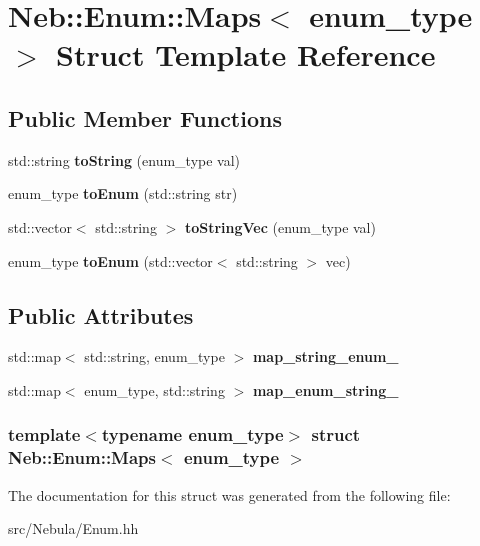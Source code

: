 \hypertarget{structNeb_1_1Enum_1_1Maps}{\section{\-Neb\-:\-:\-Enum\-:\-:\-Maps$<$ enum\-\_\-type $>$ \-Struct \-Template \-Reference}
\label{structNeb_1_1Enum_1_1Maps}
}
\subsection*{\-Public \-Member \-Functions}
\begin{DoxyCompactItemize}
\item 
\hypertarget{structNeb_1_1Enum_1_1Maps_ac9e855809a6118d50ca6d0b9a24f80a9}{std\-::string {\bfseries to\-String} (enum\-\_\-type val)}\label{structNeb_1_1Enum_1_1Maps_ac9e855809a6118d50ca6d0b9a24f80a9}

\item 
\hypertarget{structNeb_1_1Enum_1_1Maps_a716d4db5d843605cdf44a9687aca4779}{enum\-\_\-type {\bfseries to\-Enum} (std\-::string str)}\label{structNeb_1_1Enum_1_1Maps_a716d4db5d843605cdf44a9687aca4779}

\item 
\hypertarget{structNeb_1_1Enum_1_1Maps_af9858502b1b91eb41ff71c4d7e4fbc88}{std\-::vector$<$ std\-::string $>$ {\bfseries to\-String\-Vec} (enum\-\_\-type val)}\label{structNeb_1_1Enum_1_1Maps_af9858502b1b91eb41ff71c4d7e4fbc88}

\item 
\hypertarget{structNeb_1_1Enum_1_1Maps_a21e77595988229f4555999a0c9231432}{enum\-\_\-type {\bfseries to\-Enum} (std\-::vector$<$ std\-::string $>$ vec)}\label{structNeb_1_1Enum_1_1Maps_a21e77595988229f4555999a0c9231432}

\end{DoxyCompactItemize}
\subsection*{\-Public \-Attributes}
\begin{DoxyCompactItemize}
\item 
\hypertarget{structNeb_1_1Enum_1_1Maps_ad09edc976795064126040e7450a717e0}{std\-::map$<$ std\-::string, enum\-\_\-type $>$ {\bfseries map\-\_\-string\-\_\-enum\-\_\-}}\label{structNeb_1_1Enum_1_1Maps_ad09edc976795064126040e7450a717e0}

\item 
\hypertarget{structNeb_1_1Enum_1_1Maps_a6dadfc6e102d6a2c01a42fb91aed2bb9}{std\-::map$<$ enum\-\_\-type, std\-::string $>$ {\bfseries map\-\_\-enum\-\_\-string\-\_\-}}\label{structNeb_1_1Enum_1_1Maps_a6dadfc6e102d6a2c01a42fb91aed2bb9}

\end{DoxyCompactItemize}
\subsubsection*{template$<$typename enum\-\_\-type$>$ struct Neb\-::\-Enum\-::\-Maps$<$ enum\-\_\-type $>$}



\-The documentation for this struct was generated from the following file\-:\begin{DoxyCompactItemize}
\item 
src/\-Nebula/\-Enum.\-hh\end{DoxyCompactItemize}
